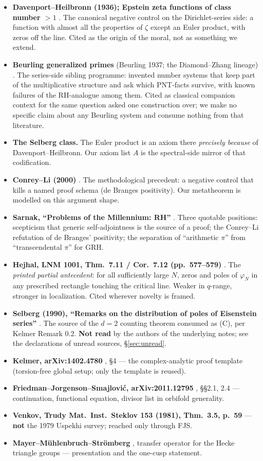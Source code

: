 \documentclass[11pt]{amsart}
\theoremstyle{remark}
\begin{document}
\begin{itemize}
\item \textbf{Davenport--Heilbronn (1936); Epstein zeta functions of
class number $>1$} \cite{DH1936}. The canonical negative control on the
Dirichlet-series side: a function with almost all the properties of
$\zeta$ except an Euler product, with zeros off the line. Cited as the
origin of the moral, not as something we extend.
\item \textbf{Beurling generalized primes} (Beurling 1937; the
Diamond--Zhang lineage) \cite{Beurling1937}. The series-side sibling
programme: invented number systems that keep part of the multiplicative
structure and ask which PNT-facts survive, with known failures of the
RH-analogue among them. Cited as classical companion context for the same
question asked one construction over; we make no specific claim about any
Beurling system and consume nothing from that literature.
\item \textbf{The Selberg class.} The Euler product is an axiom there
\emph{precisely because} of Davenport--Heilbronn. Our axiom list $A$ is
the spectral-side mirror of that codification.
\item \textbf{Conrey--Li (2000)} \cite{ConreyLi2000}. The methodological
precedent: a negative control that kills a named proof schema (de Branges
positivity). Our metatheorem is modelled on this argument shape.
\item \textbf{Sarnak, ``Problems of the Millennium: RH''} \cite{Sarnak2004}.
Three quotable positions: scepticism that generic self-adjointness is the
source of a proof; the Conrey--Li refutation of de Branges' positivity;
the separation of ``arithmetic $\pi$'' from ``transcendental $\pi$'' for
GRH.
\item \textbf{Hejhal, LNM 1001, Thm.\ 7.11 / Cor.\ 7.12 (pp.\ 577--579)}
\cite{Hejhal1983}. The \emph{printed partial antecedent}: for all
sufficiently large $N$, zeros and poles of $\varphi_N$ in any prescribed
rectangle touching the critical line. Weaker in $q$-range, stronger in
localization. Cited wherever novelty is framed.
\item \textbf{Selberg (1990), ``Remarks on the distribution of poles of
Eisenstein series''} \cite{Selberg1990}. The source of the $d=2$ counting
theorem consumed as (C), per Kelmer Remark 0.2. \textbf{Not read} by the
authors of the underlying notes; see the declarations of unread sources,
\S\ref{sec:unread}.
\item \textbf{Kelmer, arXiv:1402.4780} \cite{Kelmer2014}, \S4 --- the
complex-analytic proof template (torsion-free global setup; only the
template is reused).
\item \textbf{Friedman--Jorgenson--Smajlovi\'c, arXiv:2011.12795}
\cite{FJS2020}, \S\S2.1, 2.4 --- continuation, functional equation, divisor
list in orbifold generality.
\item \textbf{Venkov, Trudy Mat.\ Inst.\ Steklov 153 (1981), Thm.\ 3.5, p.\ 59}
\cite{Venkov1981} --- \textbf{not} the 1979 Uspekhi survey; reached only
through FJS.
\item \textbf{Mayer--M\"uhlenbruch--Str\"omberg} \cite{MMS2012}, transfer
operator for the Hecke triangle groups --- presentation and the one-cusp
statement.
\end{itemize}
\end{document}
